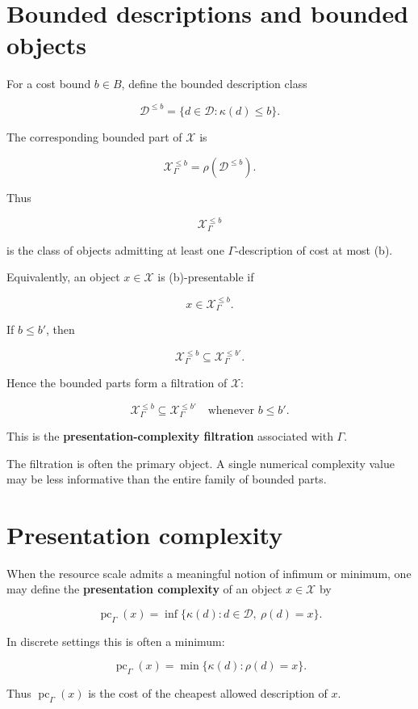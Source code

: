 \documentclass[11pt]{article}
\begin{document}
\section{Bounded descriptions and bounded objects}

For a cost bound \(b\in B\), define the bounded description class

\[
\mathcal D^{\leq b}=\{d\in\mathcal D:\kappa(d)\leq b\}.
\]

The corresponding bounded part of \(\mathcal X\) is

\[
\mathcal X_\Gamma^{\leq b}=\rho(\mathcal D^{\leq b}).
\]

Thus

\[
\mathcal X_\Gamma^{\leq b}
\]

is the class of objects admitting at least one \(\Gamma\)-description of cost at most (b).

Equivalently, an object \(x\in\mathcal X\) is (b)-presentable if

\[
x\in \mathcal X_\Gamma^{\leq b}.
\]

If \(b\leq b'\), then

\[
\mathcal X_\Gamma^{\leq b}\subseteq \mathcal X_\Gamma^{\leq b'}.
\]

Hence the bounded parts form a filtration of \(\mathcal X\):

\[
\mathcal X_\Gamma^{\leq b}
\subseteq
\mathcal X_\Gamma^{\leq b'}
\quad
\text{whenever }b\leq b'.
\]

This is the \textbf{presentation-complexity filtration} associated with \(\Gamma\).

The filtration is often the primary object. A single numerical complexity value may be less informative than the entire family of bounded parts.


\section{Presentation complexity}

When the resource scale admits a meaningful notion of infimum or minimum, one may define the \textbf{presentation complexity} of an object \(x\in\mathcal X\) by

\[
\operatorname{pc}_\Gamma(x)=\inf\{\kappa(d): d\in\mathcal D,\ \rho(d)=x\}.
\]

In discrete settings this is often a minimum:

\[
\operatorname{pc}_\Gamma(x)=\min\{\kappa(d):\rho(d)=x\}.
\]

Thus \(\operatorname{pc}_\Gamma(x)\) is the cost of the cheapest allowed description of \(x\).
\end{document}
